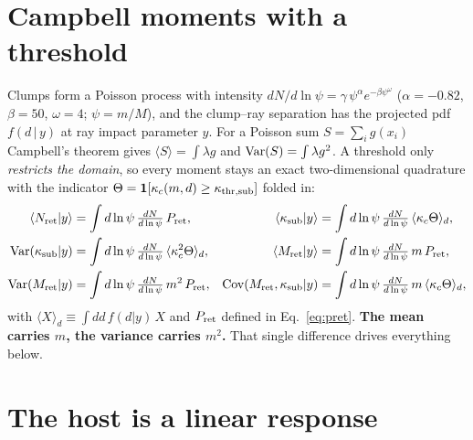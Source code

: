 \documentclass[11pt]{article}
\newcommand{\kthrs}{\kappa_{\rm thr,sub}}
\newcommand{\Mret}{M_{\rm ret}}
\newcommand{\Pret}{P_{\rm ret}}
\begin{document}
\section{Campbell moments with a threshold}

Clumps form a Poisson process with intensity $dN/d\ln\psi=\gamma\,\psi^{\alpha}
e^{-\beta\psi^{\omega}}$ ($\alpha=-0.82$, $\beta=50$, $\omega=4$; $\psi=m/M$), and the
clump--ray separation has the projected pdf $f(d\,|\,y)$ at ray impact parameter $y$.
For a Poisson sum $S=\sum_i g(x_i)$ Campbell's theorem gives $\langle S\rangle=\int\lambda g$
and ${\rm Var}(S)=\int\lambda g^{2}$. A threshold only \emph{restricts the domain}, so every
moment stays an exact two-dimensional quadrature with the indicator
$\Theta=\mathbf{1}[\kappa_c(m,d)\ge\kthrs]$ folded in:
\begin{align}
  \langle N_{\rm ret}|y\rangle      &= \int d\ln\psi\,\tfrac{dN}{d\ln\psi}\,\Pret , &
  \langle \kappa_{\rm sub}|y\rangle &= \int d\ln\psi\,\tfrac{dN}{d\ln\psi}\,
                                       \langle \kappa_c\Theta\rangle_d ,\\
  {\rm Var}(\kappa_{\rm sub}|y)     &= \int d\ln\psi\,\tfrac{dN}{d\ln\psi}\,
                                       \langle \kappa_c^{2}\Theta\rangle_d , &
  \langle \Mret|y\rangle            &= \int d\ln\psi\,\tfrac{dN}{d\ln\psi}\,m\,\Pret ,\\
  {\rm Var}(\Mret|y)                &= \int d\ln\psi\,\tfrac{dN}{d\ln\psi}\,m^{2}\,\Pret , &
  {\rm Cov}(\Mret,\kappa_{\rm sub}|y) &= \int d\ln\psi\,\tfrac{dN}{d\ln\psi}\,m\,
                                       \langle \kappa_c\Theta\rangle_d ,
\end{align}
with $\langle X\rangle_d\equiv\int dd\,f(d|y)\,X$ and $\Pret$ defined in
Eq.~\eqref{eq:pret}. \textbf{The mean carries $m$, the variance carries $m^{2}$.} That
single difference drives everything below.

\section{The host is a linear response}
\end{document}
